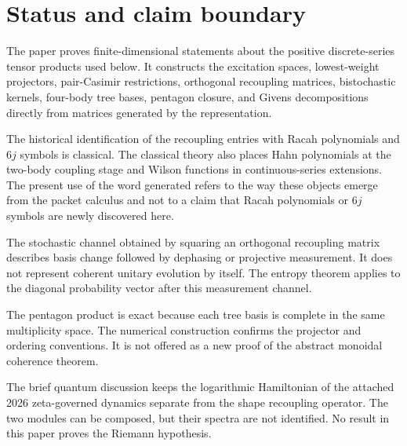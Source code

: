 \documentclass[11pt,openany]{report}
\theoremstyle{definition}
\theoremstyle{remark}
\begin{document}
\begin{abstract}
Racah polynomials, $6j$ symbols, positive discrete-series recoupling, and the pentagon identity are classical. The generated contribution is the common packet architecture joining projector reduction, exact coupling atlases, stochastic kernels, entropy production, associator coherence, and finite quantum compilation. All figures were generated by the accompanying Python program. The release contains 30 vector figures, matching PNG files, 13 built-in checks, 20 independent tests, exact tables, and the complete Python source.
\end{abstract}

\chapter*{Status and claim boundary}
The paper proves finite-dimensional statements about the positive discrete-series tensor products used below. It constructs the excitation spaces, lowest-weight projectors, pair-Casimir restrictions, orthogonal recoupling matrices, bistochastic kernels, four-body tree bases, pentagon closure, and Givens decompositions directly from matrices generated by the representation.

The historical identification of the recoupling entries with Racah polynomials and $6j$ symbols is classical. The classical theory also places Hahn polynomials at the two-body coupling stage and Wilson functions in continuous-series extensions. The present use of the word generated refers to the way these objects emerge from the packet calculus and not to a claim that Racah polynomials or $6j$ symbols are newly discovered here.

The stochastic channel obtained by squaring an orthogonal recoupling matrix describes basis change followed by dephasing or projective measurement. It does not represent coherent unitary evolution by itself. The entropy theorem applies to the diagonal probability vector after this measurement channel.

The pentagon product is exact because each tree basis is complete in the same multiplicity space. The numerical construction confirms the projector and ordering conventions. It is not offered as a new proof of the abstract monoidal coherence theorem.

The brief quantum discussion keeps the logarithmic Hamiltonian of the attached 2026 zeta-governed dynamics separate from the shape recoupling operator. The two modules can be composed, but their spectra are not identified. No result in this paper proves the Riemann hypothesis.
\end{document}

